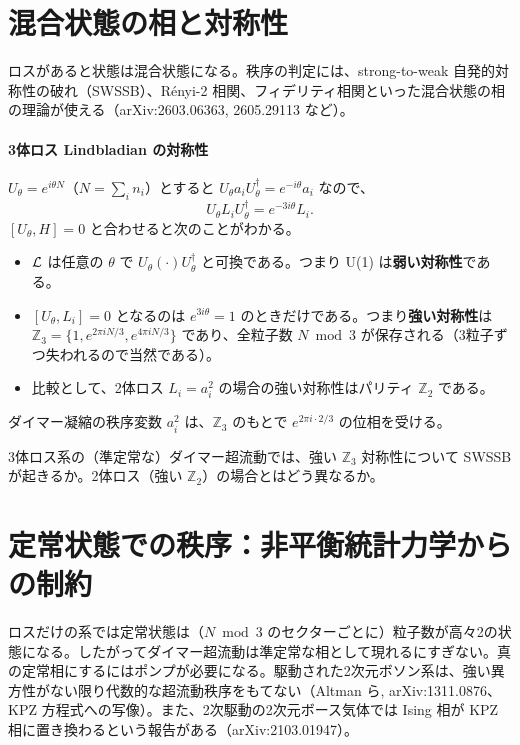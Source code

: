 \documentclass[11pt]{ltjsarticle}
\begin{document}
\section{混合状態の相と対称性}

ロスがあると状態は混合状態になる。秩序の判定には、strong-to-weak 自発的対称性の破れ（SWSSB）、Rényi-2 相関、フィデリティ相関といった混合状態の相の理論が使える（arXiv:2603.06363, 2605.29113 など）。

\paragraph{3体ロス Lindbladian の対称性 \unverified}
$U_\theta = e^{i\theta N}$（$N=\sum_i n_i$）とすると $U_\theta a_i U_\theta^\dagger = e^{-i\theta}a_i$ なので、
\begin{equation}
U_\theta L_i U_\theta^\dagger = e^{-3i\theta}L_i .
\end{equation}
$[U_\theta,H]=0$ と合わせると次のことがわかる。
\begin{itemize}
\item $\mathcal{L}$ は任意の $\theta$ で $U_\theta(\cdot)U_\theta^\dagger$ と可換である。つまり U(1) は\textbf{弱い対称性}である。
\item $[U_\theta,L_i]=0$ となるのは $e^{3i\theta}=1$ のときだけである。つまり\textbf{強い対称性}は $\mathbb{Z}_3=\{1,e^{2\pi iN/3},e^{4\pi iN/3}\}$ であり、全粒子数 $N \bmod 3$ が保存される（3粒子ずつ失われるので当然である）。
\item 比較として、2体ロス $L_i=a_i^2$ の場合の強い対称性はパリティ $\mathbb{Z}_2$ である。
\end{itemize}
ダイマー凝縮の秩序変数 $a_i^2$ は、$\mathbb{Z}_3$ のもとで $e^{2\pi i\cdot 2/3}$ の位相を受ける。

\begin{question}
3体ロス系の（準定常な）ダイマー超流動では、強い $\mathbb{Z}_3$ 対称性について SWSSB が起きるか。2体ロス（強い $\mathbb{Z}_2$）の場合とはどう異なるか。
\end{question}

\section{定常状態での秩序：非平衡統計力学からの制約}

ロスだけの系では定常状態は（$N \bmod 3$ のセクターごとに）粒子数が高々2の状態になる。したがってダイマー超流動は準定常な相として現れるにすぎない。真の定常相にするにはポンプが必要になる。駆動された2次元ボソン系は、強い異方性がない限り代数的な超流動秩序をもてない（Altman ら, arXiv:1311.0876、KPZ 方程式への写像）。また、2次駆動の2次元ボース気体では Ising 相が KPZ 相に置き換わるという報告がある（arXiv:2103.01947）。
\end{document}

